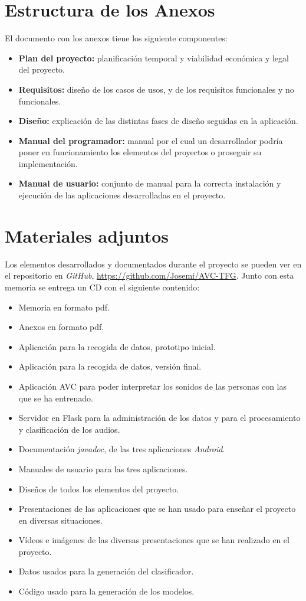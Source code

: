 \section{Estructura de los Anexos}
El documento con los anexos tiene los siguiente componentes:
\begin{itemize}
	\item
	\textbf{Plan del proyecto:} planificación temporal y viabilidad económica y legal del proyecto.
	\item
	\textbf{Requisitos:} diseño de los casos de usos, y de los requisitos funcionales y no funcionales.
	\item
	\textbf{Diseño:} explicación de las distintas fases de diseño seguidas en la aplicación.
	\item
	\textbf{Manual del programador:} manual por el cual un desarrollador podría poner en funcionamiento los elementos del proyectos o proseguir su implementación.
	\item
	\textbf{Manual de usuario:} conjunto de manual para la correcta instalación y ejecución de las aplicaciones desarrolladas en el proyecto.
\end{itemize}

\section{Materiales adjuntos}
Los elementos desarrollados y documentados durante el proyecto se pueden ver en el repositorio en \textit{GitHub}, \url{https://github.com/Josemi/AVC-TFG}.
Junto con esta memoria se entrega un CD con el siguiente contenido:
\begin{itemize}
	\item Memoria en formato pdf.
	\item Anexos en formato pdf.
	\item Aplicación para la recogida de datos, prototipo inicial.
	\item Aplicación para la recogida de datos, versión final.
	\item Aplicación AVC para poder interpretar los sonidos de las personas con las que se ha entrenado.
	\item Servidor en Flask para la administración de los datos y para el procesamiento y clasificación de los audios.
	\item Documentación \textit{javadoc}, de las tres aplicaciones \textit{Android}.
	\item Manuales de usuario para las tres aplicaciones.
	\item Diseños de todos los elementos del proyecto.
	\item Presentaciones de las aplicaciones que se han usado para enseñar el proyecto en diversas situaciones.
	\item Vídeos e imágenes de las diversas presentaciones que se han realizado en el proyecto.
	\item Datos usados para la generación del clasificador.
	\item Código usado para la generación de los modelos.
\end{itemize}	